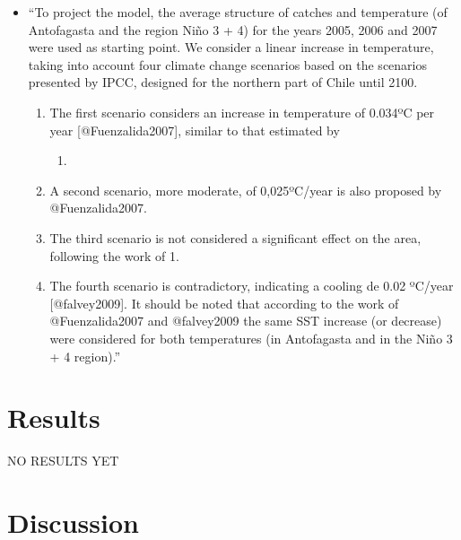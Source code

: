 \begin{itemize}
\tightlist
\item
  ``To project the model, the average structure of catches and
  temperature (of Antofagasta and the region Niño 3 + 4) for the years
  2005, 2006 and 2007 were used as starting point. We consider a linear
  increase in temperature, taking into account four climate change
  scenarios based on the scenarios presented by IPCC, designed for the
  northern part of Chile until 2100.

  \begin{enumerate}
  \def\labelenumi{\arabic{enumi}.}
  \tightlist
  \item
    The first scenario considers an increase in temperature of 0.034ºC
    per year {[}@Fuenzalida2007{]}, similar to that estimated by

    \begin{enumerate}
    \def\labelenumii{\arabic{enumii}.}
    \tightlist
    \item
    \end{enumerate}
  \item
    A second scenario, more moderate, of 0,025ºC/year is also proposed
    by @Fuenzalida2007.
  \item
    The third scenario is not considered a significant effect on the
    area, following the work of 1.
  \item
    The fourth scenario is contradictory, indicating a cooling de 0.02
    ºC/year {[}@falvey2009{]}. It should be noted that according to the
    work of @Fuenzalida2007 and @falvey2009 the same SST increase (or
    decrease) were considered for both temperatures (in Antofagasta and
    in the Niño 3 + 4 region).''
  \end{enumerate}
\end{itemize}

\hypertarget{results}{%
\section{Results}\label{results}}

NO RESULTS YET

\hypertarget{discussion}{%
\section{Discussion}\label{discussion}}


